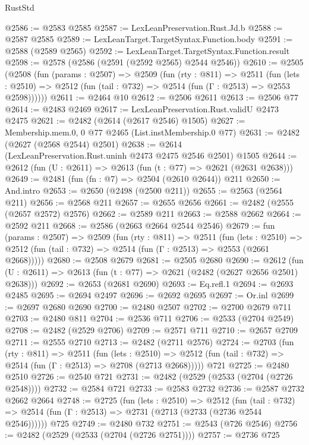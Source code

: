 \begin{lexlean}{RustStd}
\begin{coremodule}
@2586 := @2583 @2585
@2587 := LexLeanPreservation.Rust.Jd.b
@2588 := @2587 @2585
@2589 := LexLeanTarget.TargetSyntax.Function.body
@2591 := @2588 (@2589 @2565)
@2592 := LexLeanTarget.TargetSyntax.Function.result
@2598 := @2578 (@2586 (@2591 (@2592 @2565) @2544 @2546))
@2610 := @2505
    (@2508
      (fun (params : @2507) =>
      @2509
        (fun (rty : @811) =>
        @2511
          (fun (lets : @2510) =>
          @2512 (fun (tail : @732) => @2514 (fun (Γ : @2513) => @2553 @2598))))))
@2611 := @2464 @10
@2612 := @2506 @2611
@2613 := @2506 @77
@2614 := @2483 @2469
@2617 := LexLeanPreservation.Rust.validU @2473 @2475
@2621 := @2482 (@2614 (@2617 @2546) @1505)
@2627 := Membership.mem.{0, 0} @77 @2465 (List.instMembership.{0} @77)
@2631 := @2482 (@2627 (@2568 @2544) @2501)
@2638 := @2614 (LexLeanPreservation.Rust.uninh @2473 @2475 @2546 @2501) @1505
@2644 := @2612 (fun (U : @2611) => @2613 (fun (t : @77) => @2621 (@2631 @2638)))
@2649 := @2481 (fun (fn : @7) => @2504 (@2610 @2644)) @211
@2650 := And.intro
@2653 := @2650 (@2498 (@2500 @211))
@2655 := @2563 (@2564 @211)
@2656 := @2568 @211
@2657 := @2655 @2656
@2661 := @2482 (@2555 (@2657 @2572) @2576)
@2662 := @2589 @211
@2663 := @2588 @2662
@2664 := @2592 @211
@2668 := @2586 (@2663 @2664 @2544 @2546)
@2679 := fun (params : @2507) =>
  @2509
    (fun (rty : @811) =>
    @2511
      (fun (lets : @2510) =>
      @2512 (fun (tail : @732) => @2514 (fun (Γ : @2513) => @2553 (@2661 @2668)))))
@2680 := @2508 @2679
@2681 := @2505 @2680
@2690 := @2612 (fun (U : @2611) => @2613 (fun (t : @77) => @2621 (@2482 (@2627 @2656 @2501) @2638)))
@2692 := @2653 (@2681 @2690)
@2693 := Eq.refl.{1}
@2694 := @2693 @2485
@2695 := @2694 @2497
@2696 := @2692 @2695
@2697 := Or.inl
@2699 := @2697 @2680 @2690
@2700 := @2480 @2507
@2702 := @2700 @2679 @711
@2703 := @2480 @811
@2704 := @2536 @711
@2706 := @2533 (@2704 @2549)
@2708 := @2482 (@2529 @2706)
@2709 := @2571 @711
@2710 := @2657 @2709
@2711 := @2555 @2710
@2713 := @2482 (@2711 @2576)
@2724 := @2703
    (fun (rty : @811) =>
    @2511
      (fun (lets : @2510) =>
      @2512 (fun (tail : @732) => @2514 (fun (Γ : @2513) => @2708 (@2713 @2668)))))
    @721
@2725 := @2480 @2510
@2726 := @2540 @721
@2731 := @2482 (@2529 (@2533 (@2704 (@2726 @2548))))
@2732 := @2584 @721
@2733 := @2583 @2732
@2736 := @2587 @2732 @2662 @2664
@2748 := @2725
    (fun (lets : @2510) =>
    @2512
      (fun (tail : @732) => @2514 (fun (Γ : @2513) => @2731 (@2713 (@2733 (@2736 @2544 @2546))))))
    @725
@2749 := @2480 @732
@2751 := @2543 (@726 @2546)
@2756 := @2482 (@2529 (@2533 (@2704 (@2726 @2751))))
@2757 := @2736 @725

\end{coremodule}
\end{lexlean}
